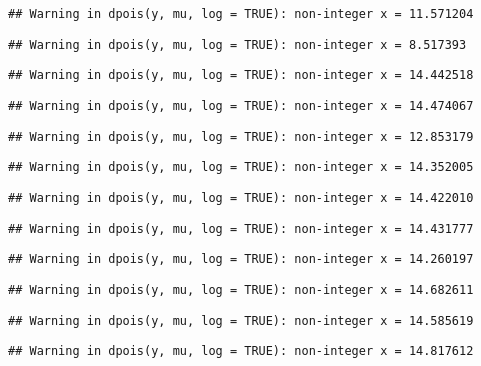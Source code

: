 \documentclass[
]{article}
\begin{document}
\begin{verbatim}
## Warning in dpois(y, mu, log = TRUE): non-integer x = 11.571204
\end{verbatim}

\begin{verbatim}
## Warning in dpois(y, mu, log = TRUE): non-integer x = 8.517393
\end{verbatim}

\begin{verbatim}
## Warning in dpois(y, mu, log = TRUE): non-integer x = 14.442518
\end{verbatim}

\begin{verbatim}
## Warning in dpois(y, mu, log = TRUE): non-integer x = 14.474067
\end{verbatim}

\begin{verbatim}
## Warning in dpois(y, mu, log = TRUE): non-integer x = 12.853179
\end{verbatim}

\begin{verbatim}
## Warning in dpois(y, mu, log = TRUE): non-integer x = 14.352005
\end{verbatim}

\begin{verbatim}
## Warning in dpois(y, mu, log = TRUE): non-integer x = 14.422010
\end{verbatim}

\begin{verbatim}
## Warning in dpois(y, mu, log = TRUE): non-integer x = 14.431777
\end{verbatim}

\begin{verbatim}
## Warning in dpois(y, mu, log = TRUE): non-integer x = 14.260197
\end{verbatim}

\begin{verbatim}
## Warning in dpois(y, mu, log = TRUE): non-integer x = 14.682611
\end{verbatim}

\begin{verbatim}
## Warning in dpois(y, mu, log = TRUE): non-integer x = 14.585619
\end{verbatim}

\begin{verbatim}
## Warning in dpois(y, mu, log = TRUE): non-integer x = 14.817612
\end{verbatim}
\end{document}
